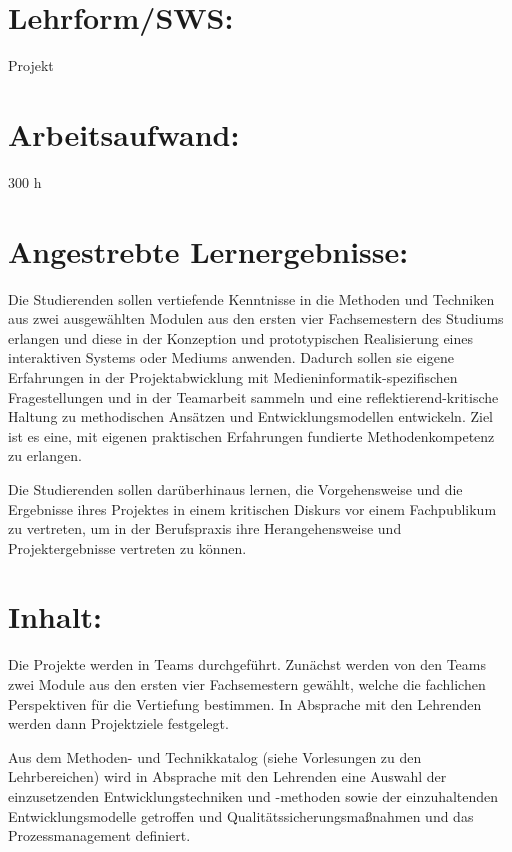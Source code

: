 \section*{Lehrform/SWS:}\label{lehrformsws-10}

Projekt

\section*{Arbeitsaufwand:}\label{arbeitsaufwand-10}

300 h

\section*{Angestrebte
Lernergebnisse:}\label{angestrebte-lernergebnisse-10}

Die Studierenden sollen vertiefende Kenntnisse in die Methoden und
Techniken aus zwei ausgewählten Modulen aus den ersten vier
Fachsemestern des Studiums erlangen und diese in der Konzeption und
prototypischen Realisierung eines interaktiven Systems oder Mediums
anwenden. Dadurch sollen sie eigene Erfahrungen in der Projektabwicklung
mit Medieninformatik-spezifischen Fragestellungen und in der Teamarbeit
sammeln und eine reflektierend-kritische Haltung zu methodischen
Ansätzen und Entwicklungsmodellen entwickeln. Ziel ist es eine, mit
eigenen praktischen Erfahrungen fundierte Methodenkompetenz zu erlangen.

Die Studierenden sollen darüberhinaus lernen, die Vorgehensweise und die
Ergebnisse ihres Projektes in einem kritischen Diskurs vor einem
Fachpublikum zu vertreten, um in der Berufspraxis ihre Herangehensweise
und Projektergebnisse vertreten zu können.

\section*{Inhalt:}\label{inhalt-10}

Die Projekte werden in Teams durchgeführt. Zunächst werden von den Teams
zwei Module aus den ersten vier Fachsemestern gewählt, welche die
fachlichen Perspektiven für die Vertiefung bestimmen. In Absprache mit
den Lehrenden werden dann Projektziele festgelegt.

Aus dem Methoden- und Technikkatalog (siehe Vorlesungen zu den
Lehrbereichen) wird in Absprache mit den Lehrenden eine Auswahl der
einzusetzenden Entwicklungstechniken und -methoden sowie der
einzuhaltenden Entwicklungsmodelle getroffen und
Qualitätssicherungsmaßnahmen und das Prozessmanagement definiert.

